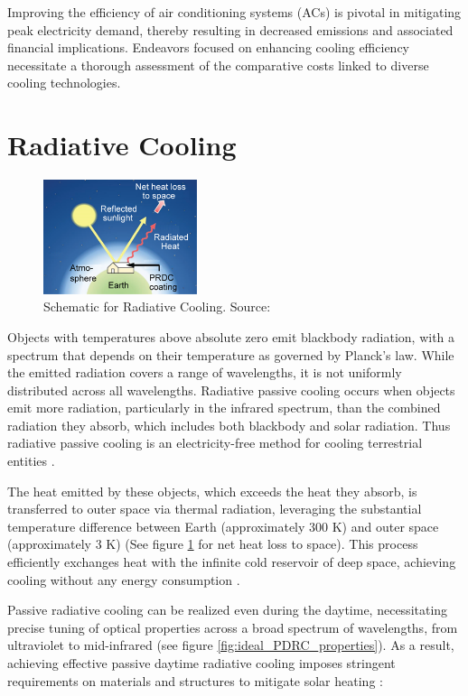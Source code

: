 Improving the efficiency of air conditioning systems (ACs) is pivotal in mitigating peak electricity demand, thereby resulting in decreased emissions and associated financial implications. Endeavors focused on enhancing cooling efficiency necessitate a thorough assessment of the comparative costs linked to diverse cooling technologies. %

\section{Radiative Cooling}

\begin{figure}
  \centering
  \includegraphics[width=0.4\textwidth]{Chapters/Figures/Schematic for Radiative Cooling.png}
  \caption[Schematic for Radiative Cooling] {Schematic for Radiative Cooling. Source: \cite{yang_passive_2020}}
  \label{fig:PDRC_Schematic}
\end{figure}

Objects with temperatures above absolute zero emit blackbody radiation, with a spectrum that depends on their temperature as governed by Planck's law. While the emitted radiation covers a range of wavelengths, it is not uniformly distributed across all wavelengths. Radiative passive cooling occurs when objects emit more radiation, particularly in the infrared spectrum, than the combined radiation they absorb, which includes both blackbody and solar radiation. Thus radiative passive cooling is an electricity-free method for cooling terrestrial entities \cite{yang_passive_2020}.

The heat emitted by these objects, which exceeds the heat they absorb, is transferred to outer space via thermal radiation, leveraging the substantial temperature difference between Earth (approximately 300 K) and outer space (approximately 3 K) (See figure \ref{fig:PDRC_Schematic} for net heat loss to space). This process efficiently exchanges heat with the infinite cold reservoir of deep space, achieving cooling without any energy consumption \cite{chen_passive_2022}.

Passive radiative cooling can be realized even during the daytime, necessitating precise tuning of optical properties across a broad spectrum of wavelengths, from ultraviolet to mid-infrared (see figure \ref{fig:ideal_PDRC_properties}). As a result, achieving effective passive daytime radiative cooling imposes stringent requirements on materials and structures to mitigate solar heating \cite{yang_passive_2020}:

